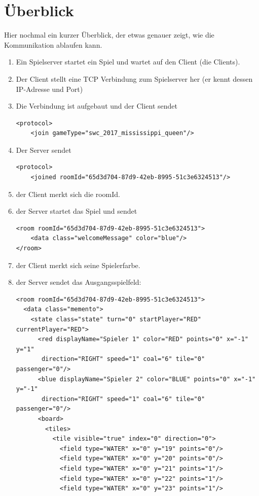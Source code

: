 \documentclass[12pt,a4paper, ngerman, oneside]{scrartcl}
\begin{document}
\newpage
\part{Überblick}
Hier nochmal ein kurzer Überblick, der etwas genauer zeigt, wie die
Kommunikation ablaufen kann.\bigskip\\

\begin{enumerate}
\item Ein Spielserver startet ein Spiel und wartet auf den Client (die Clients).
\item Der Client stellt eine TCP Verbindung zum Spielserver her (er kennt dessen IP-Adresse und Port)
\item Die Verbindung ist aufgebaut und der Client sendet \begin{verbatim}
<protocol>
    <join gameType="swc_2017_mississippi_queen"/>
\end{verbatim}
\item Der Server sendet \begin{verbatim}
<protocol>
    <joined roomId="65d3d704-87d9-42eb-8995-51c3e6324513"/>
\end{verbatim}
\item der Client merkt sich die roomId.
\item der Server startet das Spiel und sendet \begin{verbatim}
<room roomId="65d3d704-87d9-42eb-8995-51c3e6324513">
    <data class="welcomeMessage" color="blue"/>
</room>
\end{verbatim}
\item der Client merkt sich seine Spielerfarbe.
\item der Server sendet das Ausgangsspielfeld:
\begin{verbatim}
<room roomId="65d3d704-87d9-42eb-8995-51c3e6324513">
  <data class="memento">
    <state class="state" turn="0" startPlayer="RED" currentPlayer="RED">
      <red displayName="Spieler 1" color="RED" points="0" x="-1" y="1"
       direction="RIGHT" speed="1" coal="6" tile="0" passenger="0"/>
      <blue displayName="Spieler 2" color="BLUE" points="0" x="-1" y="-1"
       direction="RIGHT" speed="1" coal="6" tile="0" passenger="0"/>
      <board>
        <tiles>
          <tile visible="true" index="0" direction="0">
            <field type="WATER" x="0" y="19" points="0"/>
            <field type="WATER" x="0" y="20" points="0"/>
            <field type="WATER" x="0" y="21" points="1"/>
            <field type="WATER" x="0" y="22" points="1"/>
            <field type="WATER" x="0" y="23" points="1"/>

\end{verbatim}
\end{enumerate}
\end{document}

